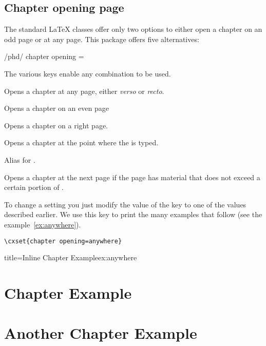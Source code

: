 \section{Chapter opening page}

The standard LaTeX classes offer only two options to either open a chapter on an odd page or at any page. This package offers five alternatives:

\begin{key}{/phd/ chapter opening = }

\end{key}

The various keys enable any combination to be used.

\begin{marglist}
\item [any] Opens a chapter at any page, either \textit{verso} or \textit{recto}.
\item [left] Opens a chapter on an even page
\item [right] Opens a chapter on a right page.
\item [anywhere] Opens a chapter at the point where the  is typed.
\item [none] Alias for .
\item [ifafter] Opens a chapter at the next page if the page has material that does not exceed a certain portion of .
\end{marglist}

To change a setting you just modify the value of the key  to one of the values described earlier. We use this key to print the many examples that follow (see the example~\ref{ex:anywhere}). 



\begin{tcolorbox}
\begin{lstlisting}
\cxset{chapter opening=anywhere}
\end{lstlisting}
\end{tcolorbox}


\@specialfalse


\begin{texexample}{title=Inline Chapter Example}{ex:anywhere}

\lipsum[2]
\chapter{Chapter Example}
\lipsum[3]
\chapter{Another Chapter Example}
\lipsum[4]
\end{texexample}

